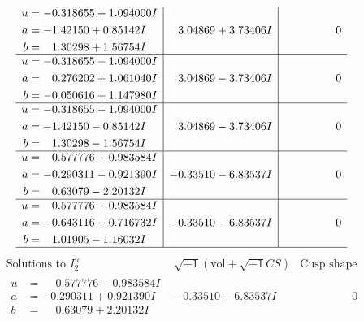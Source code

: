 \documentclass[1p]{elsarticle_modified}
\theoremstyle{definition}
\newcommand{\I}{\sqrt{-1}}
\begin{document}
$$\begin{array}{c|c|c}
\begin{aligned}
u &= -0.318655 + 1.094000 I \\
a &= -1.42150 + 0.85142 I \\
b &= \phantom{-}1.30298 + 1.56754 I\end{aligned}
 & \phantom{-}3.04869 + 3.73406 I & \phantom{-0.000000 } 0 \\ \hline\begin{aligned}
u &= -0.318655 - 1.094000 I \\
a &= \phantom{-}0.276202 + 1.061040 I \\
b &= -0.050616 + 1.147980 I\end{aligned}
 & \phantom{-}3.04869 - 3.73406 I & \phantom{-0.000000 } 0 \\ \hline\begin{aligned}
u &= -0.318655 - 1.094000 I \\
a &= -1.42150 - 0.85142 I \\
b &= \phantom{-}1.30298 - 1.56754 I\end{aligned}
 & \phantom{-}3.04869 - 3.73406 I & \phantom{-0.000000 } 0 \\ \hline\begin{aligned}
u &= \phantom{-}0.577776 + 0.983584 I \\
a &= -0.290311 - 0.921390 I \\
b &= \phantom{-}0.63079 - 2.20132 I\end{aligned}
 & -0.33510 - 6.83537 I & \phantom{-0.000000 } 0 \\ \hline\begin{aligned}
u &= \phantom{-}0.577776 + 0.983584 I \\
a &= -0.643116 - 0.716732 I \\
b &= \phantom{-}1.01905 - 1.16032 I\end{aligned}
 & -0.33510 - 6.83537 I & \phantom{-0.000000 } 0\\
 \hline 
 \end{array}$$\newpage$$\begin{array}{c|c|c}  
\text{Solutions to }I^u_{2}& \I (\text{vol} + \sqrt{-1}CS) & \text{Cusp shape}\\
 \hline 
\begin{aligned}
u &= \phantom{-}0.577776 - 0.983584 I \\
a &= -0.290311 + 0.921390 I \\
b &= \phantom{-}0.63079 + 2.20132 I\end{aligned}
 & -0.33510 + 6.83537 I & \phantom{-0.000000 } 0 \\ \hline\begin{aligned}

\end{aligned}
\end{array}$$
\end{document}
